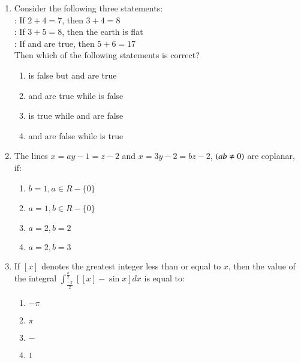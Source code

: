 \documentclass[journal,9pt,onecolumn]{IEEEtran}
\begin{document}
\begin{enumerate}
    \item Consider the following three statements:\\
    : If $2+4=7$, then $3+4=8$\\
    : If $3+5=8$, then the earth is flat\\
    : If  and  are true, then $5+6=17$\\
    Then which of the following statements is correct?

		\begin{multicols}{2}
			\begin{enumerate}
				\item {} is false but  and  are true
                    \item {} and  are true while  is false
                    \item {} is true while  and  are false
                    \item {} and  are false while  is true
			\end{enumerate}
		\end{multicols}

    \item The lines $x=ay-1=z-2$ and $x=3y-2=bz-2$, $\left(ab\neq 0\right)$ are coplanar, if:

		\begin{multicols}{2}
			\begin{enumerate}
				\item $b=1, a\in R-\{0\}$
				\item $a=1, b\in R-\{0\}$
				\item $a=2,b=2$
				\item $a=2,b=3$
			\end{enumerate}
		\end{multicols}

    \item If $\left[x\right]$ denotes the greatest integer less than or equal to $x$, then the value of the integral $\int_{\frac{-\pi}{2}}^{\frac{\pi}{2}}\left[\left[x\right]-\sin x\right]dx$ is equal to:
    
        \begin{multicols}{4}
            \begin{enumerate}
                \item $-\pi$
                \item $\pi$
                \item $-$
                \item $1$
            \end{enumerate}
        \end{multicols}


\end{enumerate}
\end{document}
